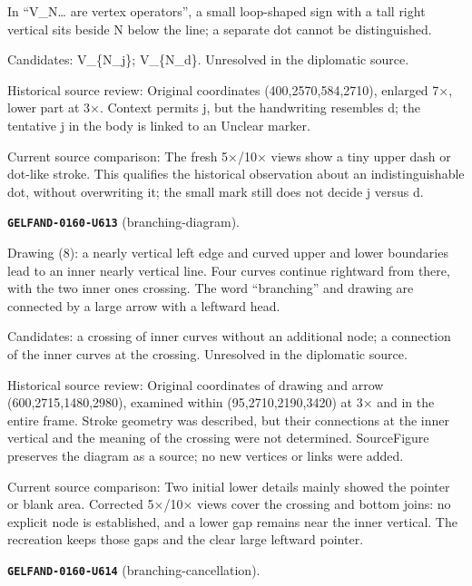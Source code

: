 In “V\_N… are vertex operators”, a small loop-shaped sign with a tall right vertical sits beside N below the line; a separate dot cannot be distinguished.\par
Candidates: V\_\{N\_j\}; V\_\{N\_d\}. Unresolved in the diplomatic source.\par
Historical source review: Original coordinates (400,2570,584,2710), enlarged 7×, lower part at 3×. Context permits j, but the handwriting resembles d; the tentative j in the body is linked to an Unclear marker.\par
Current source comparison: The fresh 5×/10× views show a tiny upper dash or dot-like stroke. This qualifies the historical observation about an indistinguishable dot, without overwriting it; the small mark still does not decide j versus d.\par\medskip
\par\noindent\leavevmode{}\label{GELFAND-0160-U613}\label{GELFAND-P001484:branching-diagram}\textbf{\texttt{GELFAND-0160-U613}} (branching-diagram).\nopagebreak[4]\par
Drawing (8): a nearly vertical left edge and curved upper and lower boundaries lead to an inner nearly vertical line. Four curves continue rightward from there, with the two inner ones crossing. The word “branching” and drawing are connected by a large arrow with a leftward head.\par
Candidates: a crossing of inner curves without an additional node; a connection of the inner curves at the crossing. Unresolved in the diplomatic source.\par
Historical source review: Original coordinates of drawing and arrow (600,2715,1480,2980), examined within (95,2710,2190,3420) at 3× and in the entire frame. Stroke geometry was described, but their connections at the inner vertical and the meaning of the crossing were not determined. SourceFigure preserves the diagram as a source; no new vertices or links were added.\par
Current source comparison: Two initial lower details mainly showed the pointer or blank area. Corrected 5×/10× views cover the crossing and bottom joins: no explicit node is established, and a lower gap remains near the inner vertical. The recreation keeps those gaps and the clear large leftward pointer.\par\medskip
\par\noindent\leavevmode{}\label{GELFAND-0160-U614}\label{GELFAND-P001484:branching-cancellation}\textbf{\texttt{GELFAND-0160-U614}} (branching-cancellation).\nopagebreak[4]\par
